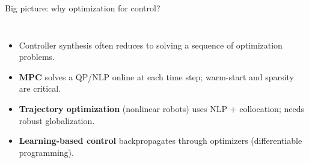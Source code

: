 \begin{frame}[t]{Big picture: why optimization for control?}
\begin{columns}[T,onlytextwidth]
  \small
  \begin{itemize}[<+->]\setlength{\itemsep}{2pt}
    \item Controller synthesis often reduces to solving a sequence of optimization problems.
    \item \textbf{MPC} solves a QP/NLP online at each time step; warm-start and sparsity are critical.
    \item \textbf{Trajectory optimization} (nonlinear robots) uses NLP + collocation; needs robust globalization.
    \item \textbf{Learning-based control} backpropagates through optimizers (differentiable programming).
  \end{itemize}

  \centering
\end{columns}
\end{frame}
